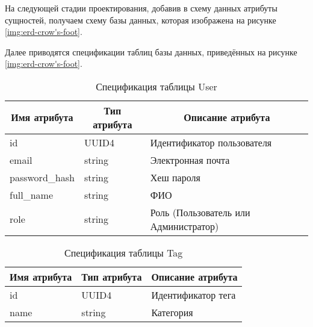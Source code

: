 \documentclass{bmstu-gost-7-32}
\begin{document}
На следующей стадии проектирования, добавив в схему данных атрибуты сущностей, получаем схему базы данных, которая изображена на рисунке \ref{img:erd-crow's-foot}.


Далее приводятся спецификации таблиц базы данных, приведённых на рисунке \ref{img:erd-crow's-foot}.

\begin{table}[H]
	\caption{Спецификация таблицы User}
	\begin{tabular}{|l|l|l|}
		\hline
		\multicolumn{1}{|c|}{\textbf{Имя атрибута}} & \multicolumn{1}{c|}{\textbf{Тип атрибута}} & \multicolumn{1}{c|}{\textbf{Описание атрибута}} \\ \hline
		id                                          & UUID4                                      & Идентификатор пользователя                      \\ \hline
		email                                       & string                                     & Электронная почта                               \\ \hline
		password\_hash                              & string                                     & Хеш пароля                                      \\ \hline
		full\_name                                  & string                                     & ФИО                                             \\ \hline
		role                                        & string                                     & Роль (Пользователь или Администратор)           \\ \hline
	\end{tabular}
\end{table}

\begin{table}[H]
	\caption{Спецификация таблицы Tag}
	\begin{tabular}{|l|l|l|}
		\hline
		\multicolumn{1}{|c|}{\textbf{Имя атрибута}} & \multicolumn{1}{c|}{\textbf{Тип атрибута}} & \multicolumn{1}{c|}{\textbf{Описание атрибута}} \\ \hline
		id                                          & UUID4                                      & Идентификатор тега                              \\ \hline
		name                                        & string                                     & Категория                                       \\ \hline
	\end{tabular}
\end{table}
\end{document}
